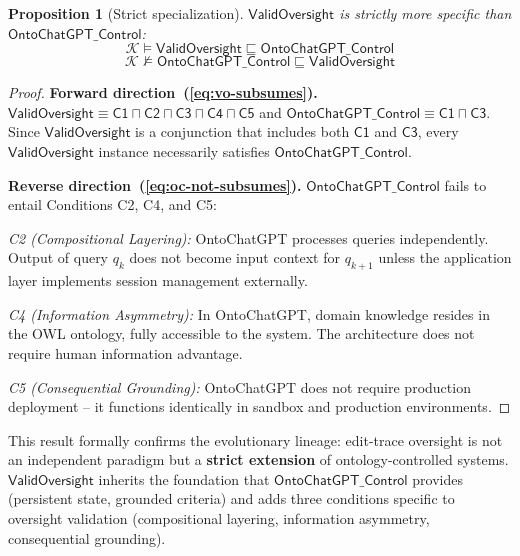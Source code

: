 \documentclass[11pt]{article}
\newtheorem{proposition}{Proposition}[section]
\newcommand{\KB}{\ensuremath{\mathcal{K}}\xspace}
\newcommand{\sqsub}{\sqsubseteq}
\begin{document}
\begin{proposition}[Strict specialization]
\label{prop:non-subsumption}
$\mathsf{ValidOversight}$ is strictly more specific than $\mathsf{OntoChatGPT\_Control}$:
\begin{equation}
  \KB \models \mathsf{ValidOversight} \sqsub \mathsf{OntoChatGPT\_Control}
  \label{eq:vo-subsumes}
\end{equation}
\begin{equation}
  \KB \not\models \mathsf{OntoChatGPT\_Control} \sqsub \mathsf{ValidOversight}
  \label{eq:oc-not-subsumes}
\end{equation}
\end{proposition}

\begin{proof}
\textbf{Forward direction~(\ref{eq:vo-subsumes}).}
$\mathsf{ValidOversight} \equiv \mathsf{C1} \sqcap \mathsf{C2} \sqcap \mathsf{C3} \sqcap \mathsf{C4} \sqcap \mathsf{C5}$ and $\mathsf{OntoChatGPT\_Control} \equiv \mathsf{C1} \sqcap \mathsf{C3}$.
Since $\mathsf{ValidOversight}$ is a conjunction that includes both $\mathsf{C1}$ and $\mathsf{C3}$, every $\mathsf{ValidOversight}$ instance necessarily satisfies $\mathsf{OntoChatGPT\_Control}$.

\textbf{Reverse direction~(\ref{eq:oc-not-subsumes}).}
$\mathsf{OntoChatGPT\_Control}$ fails to entail Conditions C2, C4, and C5:

\emph{C2 (Compositional Layering):}
OntoChatGPT processes queries independently.
Output of query $q_k$ does not become input context for $q_{k+1}$ unless the application layer implements session management externally.

\emph{C4 (Information Asymmetry):}
In OntoChatGPT, domain knowledge resides in the OWL ontology, fully accessible to the system.
The architecture does not require human information advantage.

\emph{C5 (Consequential Grounding):}
OntoChatGPT does not require production deployment -- it functions identically in sandbox and production environments.
\end{proof}

This result formally confirms the evolutionary lineage: edit-trace oversight is not an independent paradigm but a \textbf{strict extension} of ontology-controlled systems.
$\mathsf{ValidOversight}$ inherits the foundation that $\mathsf{OntoChatGPT\_Control}$ provides (persistent state, grounded criteria) and adds three conditions specific to oversight validation (compositional layering, information asymmetry, consequential grounding).
\end{document}
